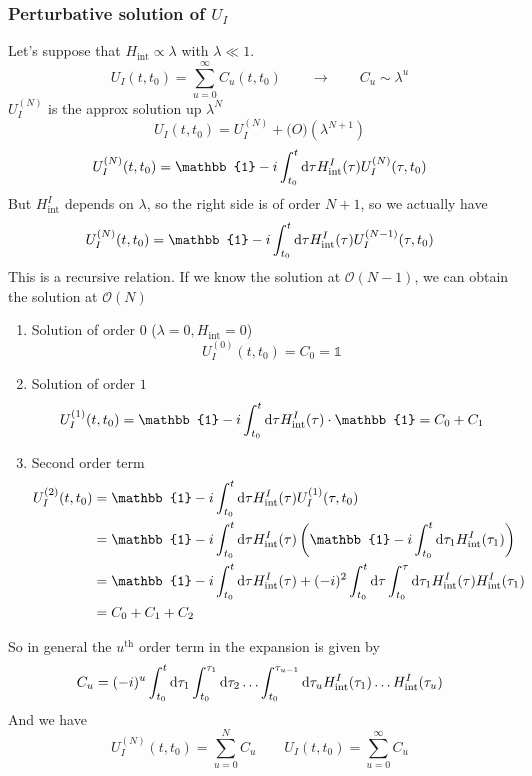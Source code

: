 \subsubsection[Perturbative solution of U\_I]{Perturbative solution of $U_I$}
Let's suppose that $H_\text{int} \propto \lambda$ with $\lambda \ll 1$.
\[U_I(t,t_0) = \sum^\infty_{u=0}C_u(t,t_0) \qquad \to \qquad C_u \sim \lambda^u \]
$U_I^{(N)}$ is the approx solution up $\lambda^N$
\[ U_I(t,t_0) = U_I^{(N)} + \mathcal(O)(\lambda^{N+1}) \]
\[ U_I^{(N)}(t,t_0) = \mathbb{1} - i\int^t_{t_0} \diff{\tau}H^I_\text{int}(\tau)U_I^{(N)}(\tau,t_0) \]
But $H^I_\text{int}$ depends on $\lambda$, so the right side is of order $N+1$, so we actually have
\[ U_I^{(N)}(t,t_0) = \mathbb{1} - i\int^t_{t_0} \diff{\tau}H^I_\text{int}(\tau)U_I^{(N-1)}(\tau,t_0) \]
This is a recursive relation. If we know the solution at $\mathcal{O}(N-1)$, we can obtain the solution at $\mathcal{O}(N)$

\begin{enumerate}
\item Solution of order $0$ ($\lambda=0, H_\text{int}=0$)
\[ U_I^{(0)}(t,t_0) = C_0 = \mathbb{1} \]
\item Solution of order $1$
\[ U_I^{(1)}(t,t_0) = \mathbb{1} - i \int^t_{t_0} \diff{\tau}H_\text{int}^I(\tau)\cdot\mathbb{1} = C_0 + C_1 \]
\item Second order term
\begin{align*}
U_I^{(2)}(t,t_0) &= \mathbb{1} - i\int^t_{t_0}\diff{\tau}H_\text{int}^I(\tau)U_I^{(1)}(\tau,t_0) \\
&= \mathbb{1} - i\int^t_{t_0}\diff{\tau}H_\text{int}^I(\tau)\left(\mathbb{1} - i \int^t_{t_0} \diff{\tau_1}H_\text{int}^I(\tau_1)\right) \\
&= \mathbb{1} - i\int^t_{t_0}\diff{\tau}H_\text{int}^I(\tau)+ (-i)^2\int^t_{t_0}\diff{\tau}\int^\tau_{t_0}\diff{\tau_1}H_\text{int}^I(\tau)H_\text{int}^I(\tau_1) \\
&= C_0 + C_1 + C_2
\end{align*}
\end{enumerate}
So in general the $u^\text{th}$ order term in the expansion is given by
\[ C_u = (-i)^u\int^t_{t_0}\operatorname{d \!}{\tau_1}\int^{\tau_1}_{t_0}\operatorname{d \!}{\tau_2}\ldots\int^{\tau_{u-1}}_{t_0}\operatorname{d \!}{\tau_u}H_\text{int}^I(\tau_1)\ldots H_\text{int}^I(\tau_u) \]
And we have
\[ U_I^{(N)}(t,t_0) = \sum^N_{u=0}C_u \qquad U_I(t,t_0)=\sum^\infty_{u=0}C_u \]

